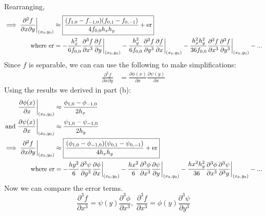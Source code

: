 \documentclass[12pt]{article}
\begin{document}
\begin{enumerate}
\begin{enumerate}
\begin{align*}
        \end{align*}
        Rearranging,
        \begin{align*}
            \implies \frac{\partial^2f}{\partial x\partial y}\bigg|_{(x_0,y_0)}&\approx \boxed{\frac{(f_{1,0}-f_{-1,0})(f_{0,1}-f_{0,-1})}{4f_{0,0}h_xh_y} + {\rm er}}\\
            \text{where }{\rm er}&=-\frac{h_x^2}{6f_{0,0}}\frac{\partial^3f}{\partial x^3}\frac{\partial f}{\partial y}\bigg|_{(x_0,y_0)}-\frac{h_y^2}{6f_{0,0}}\frac{\partial^3f}{\partial y^3}\frac{\partial f}{\partial x}\bigg|_{(x_0,y_0)}-\frac{h_x^2h_y^2}{36f_{0,0}}\frac{\partial^3f}{\partial x^3}\frac{\partial^3f}{\partial y^3}\bigg|_{(x_0,y_0)}-...
        \end{align*}
        Since $f$ is separable, we can can use the following to make simplifications:
        \begin{align*}
            \frac{\partial^2f}{\partial x\partial y}&=\frac{\partial\phi(x)}{\partial x}\frac{\partial\psi(y)}{\partial x}
        \end{align*}
        Using the results we derived in part (b):
        \begin{align*}
            \frac{\partial\phi(x)}{\partial x}\bigg|_{(x_0,y_0)}&\approx\frac{\phi_{1,0}-\phi_{-1,0}}{2h_x}\\
            \text{and }\frac{\partial\psi(x)}{\partial x}\bigg|_{(x_0,y_0)}&\approx\frac{\psi_{1,0}-\psi_{-1,0}}{2h_y}\\
            \implies \frac{\partial^2f}{\partial x\partial y}\bigg|_{(x_0,y_0)}&\approx\boxed{\frac{(\phi_{1,0}-\phi_{-1,0})(\psi_{0,1}-\psi_{0,-1})}{4h_xh_y} + {\rm er}}\\
            \text{where } {\rm er}&=-\frac{hy^2}{6}\frac{\partial^3\psi}{\partial y^3}\frac{\partial\phi}{\partial x}\bigg|_{(x_0,y_0)}-\frac{hx^2}{6}\frac{\partial^3\phi}{\partial x^3}\frac{\partial\psi}{\partial y}\bigg|_{(x_0,y_0)}-\frac{hx^2h_y^2}{36}\frac{\partial^3\phi}{\partial x^3}\frac{\partial^3\psi}{\partial^3 y}\bigg|_{(x_0,y_0)}-...
        \end{align*}
        Now we can compare the error terms.
        \begin{equation*}
            \frac{\partial^3 f}{\partial x^3}=\psi(y)\frac{\partial^3\phi}{\partial x^3},\;\frac{\partial^3 f}{\partial x^3}=\phi(y)\frac{\partial^3\psi}{\partial y^3}

\end{equation*}
\end{enumerate}
\end{enumerate}
\end{document}
